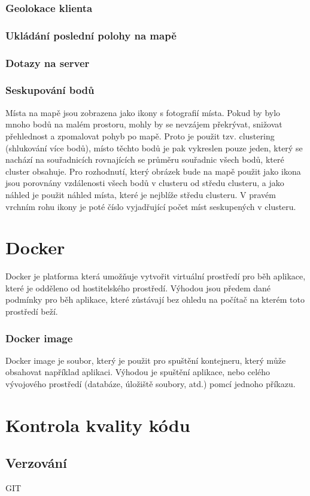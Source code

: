 \documentclass[12pt, a4paper,
 twoside,        %
 openright
]{report}
\begin{document}
    \subsection{Geolokace klienta}
    \subsection{Ukládání poslední polohy na mapě}
    \subsection{Dotazy na server}
    \subsection{Seskupování bodů}
    Místa na mapě jsou zobrazena jako ikony s fotografií místa. Pokud by bylo mnoho bodů na malém prostoru, mohly by se nevzájem překrývat, snižovat přehlednost a zpomalovat pohyb po mapě. Proto je použit tzv. clustering (shlukování více bodů), místo těchto bodů je pak vykreslen pouze jeden, který se nachází na souřadnicích rovnajících se průměru souřadnic všech bodů, které cluster obsahuje. Pro rozhodnutí, který obrázek bude na mapě použit jako ikona jsou porovnány vzdálenosti všech bodů v clusteru od středu clusteru, a jako náhled je použit náhled místa, které je nejblíže středu clusteru. V pravém vrchním rohu ikony je poté číslo vyjadřující počet míst seskupených v clusteru.


\chapter{Docker}
Docker je platforma která umožňuje vytvořit virtuální prostředí pro 
běh aplikace, které je odděleno od hostitelského prostředí.
Výhodou jsou předem dané podmínky pro běh aplikace, které zůstávají
bez ohledu na počítač na kterém toto prostředí beží. 
\subsection{Docker image}
Docker image je soubor, který je použit pro spuštění kontejneru, který
může obsahovat například aplikaci. Výhodou je spuštění aplikace,
nebo celého vývojového prostředí (databáze, úložiště soubory, atd.) pomcí
jednoho příkazu.

\chapter{Kontrola kvality kódu}
\section{Verzování}
GIT
\end{document}
